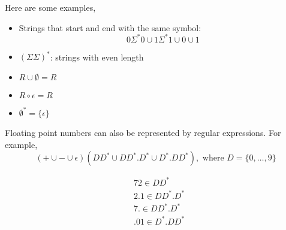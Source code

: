 \begin{eg}
Here are some examples,
\begin{itemize}
    \item 
    Strings that start and end with the same symbol:
    \begin{equation*}
        0 \Sigma^*0 \cup 1 \Sigma^*1\cup 0 \cup 1
    \end{equation*}
    \item $(\Sigma \Sigma)^*$: strings with even length
    \item $R\cup \emptyset=R$
    \item $R \circ \epsilon=R$
    \item $\emptyset^*=\{\epsilon\}$
\end{itemize}
\end{eg}

Floating point numbers can also be represented by regular expressions. For example,
\[
(+\cup-\cup\epsilon)(DD^*\cup DD^*.D^*\cup D^*.DD^*), \text{ where } D = \{0, \ldots,9\}
\]

\begin{eg}
\begin{align*}
    & 72 \in DD^*\\
    & 2.1 \in DD^*.D^*\\
    &  7. \in DD^*.D^*\\
    & .01 \in D^*.DD^*
\end{align*}
\end{eg}

